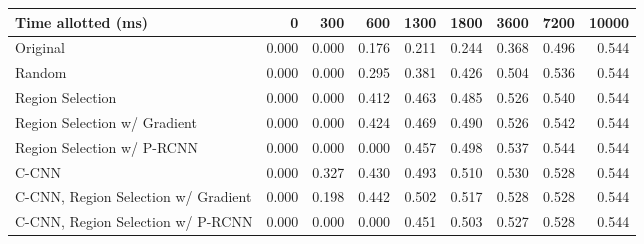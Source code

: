 \begin{tabular}{lrrrrrrrr}
\toprule
Time allotted (ms) &  0     &  300   &  600   &  1300  &  1800  &  3600  &  7200  &  10000 \\
\midrule
Original                            &  0.000 &  0.000 &  0.176 &  0.211 &  0.244 &  0.368 &  0.496 &  0.544 \\
Random                              &  0.000 &  0.000 &  0.295 &  0.381 &  0.426 &  0.504 &  0.536 &  0.544 \\
Region Selection                    &  0.000 &  0.000 &  0.412 &  0.463 &  0.485 &  0.526 &  0.540 &  0.544 \\
Region Selection w/ Gradient        &  0.000 &  0.000 &  0.424 &  0.469 &  0.490 &  0.526 &  0.542 &  0.544 \\
Region Selection w/ P-RCNN          &  0.000 &  0.000 &  0.000 &  0.457 &  0.498 &  0.537 &  0.544 &  0.544 \\
C-CNN                               &  0.000 &  0.327 &  0.430 &  0.493 &  0.510 &  0.530 &  0.528 &  0.544 \\
C-CNN, Region Selection w/ Gradient &  0.000 &  0.198 &  0.442 &  0.502 &  0.517 &  0.528 &  0.528 &  0.544 \\
C-CNN, Region Selection w/ P-RCNN   &  0.000 &  0.000 &  0.000 &  0.451 &  0.503 &  0.527 &  0.528 &  0.544 \\
\bottomrule
\end{tabular}
